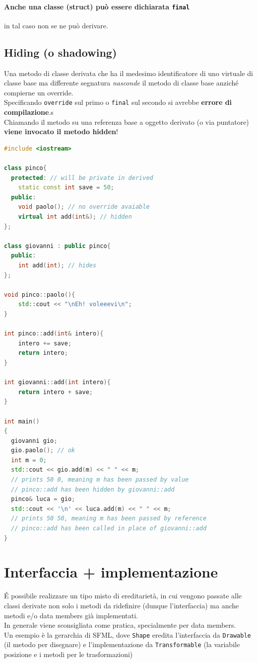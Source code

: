 \documentclass[10pt, oneside]{book}
\begin{document}
\paragraph{Anche una classe (struct) può essere dichiarata \texttt{final}} in tal caso non se ne può derivare.

\subsection{Hiding (o shadowing)}
Una metodo di classe derivata che ha il medesimo identificatore di uno virtuale di classe base ma differente segnatura \textit{nasconde} il metodo di classe base anziché compierne un override.\\
Specificando \texttt{override} sul primo o \texttt{final} sul secondo si avrebbe \textbf{errore di compilazione}.s\\
Chiamando il metodo su una referenza base a oggetto derivato (o via puntatore) \textbf{viene invocato il metodo hidden}!
\begin{lstlisting}[language=C++]
#include <iostream>

class pinco{
  protected: // will be private in derived
    static const int save = 50;
  public:
    void paolo(); // no override avaiable
    virtual int add(int&); // hidden
};

class giovanni : public pinco{
  public:
    int add(int); // hides
};

void pinco::paolo(){
    std::cout << "\nEh! voleeevi\n";
}

int pinco::add(int& intero){
    intero += save;
    return intero;
}

int giovanni::add(int intero){
    return intero + save;
}

int main()
{
  giovanni gio;
  gio.paolo(); // ok
  int m = 0;
  std::cout << gio.add(m) << " " << m; 
  // prints 50 0, meaning m has been passed by value
  // pinco::add has been hidden by giovanni::add
  pinco& luca = gio;
  std::cout << '\n' << luca.add(m) << " " << m;
  // prints 50 50, meaning m has been passed by reference
  // pinco::add has been called in place of giovanni::add
}
\end{lstlisting}

\section{Interfaccia + implementazione}
\'E possibile realizzare un tipo misto di ereditarietà, in cui vengono passate alle classi derivate non solo i metodi da ridefinire (dunque l'interfaccia) ma anche metodi e/o data members già implementati.\\
In generale viene sconsigliata come pratica, specialmente per data members.\\
Un esempio è la gerarchia di SFML, dove \texttt{Shape} eredita l'interfaccia da \texttt{Drawable} (il metodo per disegnare) e l'implementazione da \texttt{Transformable} (la variabile posizione e i metodi per le trasformazioni)
\end{document}
